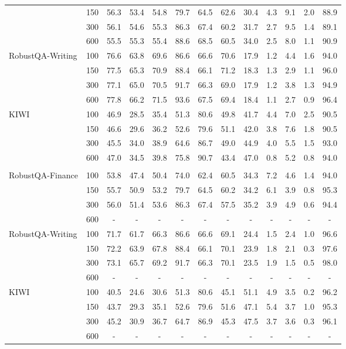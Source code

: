 \begin{table}[h]
{\begin{tabular}{lcccccccccccc}
 & 150 & 56.3 & 53.4 & 54.8 & 79.7 & 64.5 & 62.6 & 30.4 & 4.3 & 9.1 & 2.0 & 88.9 \\
 & 300 & 56.1 & 54.6 & 55.3 & 86.3 & 67.4 & 60.2 & 31.7 & 2.7 & 9.5 & 1.4 & 89.1 \\
 & 600 & 55.5 & 55.3 & 55.4 & 88.6 & 68.5 & 60.5 & 34.0 & 2.5 & 8.0 & 1.1 & 90.9 \\
\multirow{4}{*}{RobustQA-Writing} & 100 & 76.6 & 63.8 & 69.6 & 86.6 & 66.6 & 70.6 & 17.9 & 1.2 & 4.4 & 1.6 & 94.0 \\
 & 150 & 77.5 & 65.3 & 70.9 & 88.4 & 66.1 & 71.2 & 18.3 & 1.3 & 2.9 & 1.1 & 96.0 \\
 & 300 & 77.1 & 65.0 & 70.5 & 91.7 & 66.3 & 69.0 & 17.9 & 1.2 & 3.8 & 1.3 & 94.9 \\
 & 600 & 77.8 & 66.2 & 71.5 & 93.6 & 67.5 & 69.4 & 18.4 & 1.1 & 2.7 & 0.9 & 96.4 \\
\multirow{4}{*}{KIWI} & 100 & 46.9 & 28.5 & 35.4 & 51.3 & 80.6 & 49.8 & 41.7 & 4.4 & 7.0 & 2.5 & 90.5 \\
 & 150 & 46.6 & 29.6 & 36.2 & 52.6 & 79.6 & 51.1 & 42.0 & 3.8 & 7.6 & 1.8 & 90.5 \\
 & 300 & 45.5 & 34.0 & 38.9 & 64.6 & 86.7 & 49.0 & 44.9 & 4.0 & 5.5 & 1.5 & 93.0 \\
 & 600 & 47.0 & 34.5 & 39.8 & 75.8 & 90.7 & 43.4 & 47.0 & 0.8 & 5.2 & 0.8 & 94.0 \\
\rowcolor{Blue}
\multicolumn{13}{c}{\textbf{E5-Mistral + Llama3 70B}} \\
\multirow{4}{*}{RobustQA-Finance} & 100 & 53.8 & 47.4 & 50.4 & 74.0 & 62.4 & 60.5 & 34.3 & 7.2 & 4.6 & 1.4 & 94.0 \\
 & 150 & 55.7 & 50.9 & 53.2 & 79.7 & 64.5 & 60.2 & 34.2 & 6.1 & 3.9 & 0.8 & 95.3 \\
 & 300 & 56.0 & 51.4 & 53.6 & 86.3 & 67.4 & 57.5 & 35.2 & 3.9 & 4.9 & 0.6 & 94.4 \\
 & 600 & - & - & - & - & - & - & - & - & - & - & - \\
\multirow{4}{*}{RobustQA-Writing} & 100 & 71.7 & 61.7 & 66.3 & 86.6 & 66.6 & 69.1 & 24.4 & 1.5 & 2.4 & 1.0 & 96.6 \\
 & 150 & 72.2 & 63.9 & 67.8 & 88.4 & 66.1 & 70.1 & 23.9 & 1.8 & 2.1 & 0.3 & 97.6 \\
 & 300 & 73.1 & 65.7 & 69.2 & 91.7 & 66.3 & 70.1 & 23.5 & 1.9 & 1.5 & 0.5 & 98.0 \\
 & 600 & - & - & - & - & - & - & - & - & - & - & - \\
\multirow{4}{*}{KIWI} & 100 & 40.5 & 24.6 & 30.6 & 51.3 & 80.6 & 45.1 & 51.1 & 4.9 & 3.5 & 0.2 & 96.2 \\
 & 150 & 43.7 & 29.3 & 35.1 & 52.6 & 79.6 & 51.6 & 47.1 & 5.4 & 3.7 & 1.0 & 95.3 \\
 & 300 & 45.2 & 30.9 & 36.7 & 64.7 & 86.9 & 45.3 & 47.5 & 3.7 & 3.6 & 0.3 & 96.1 \\
 & 600 & - & - & - & - & - & - & - & - & - & - & - \\
\bottomrule
\end{tabular}
}
\end{table}